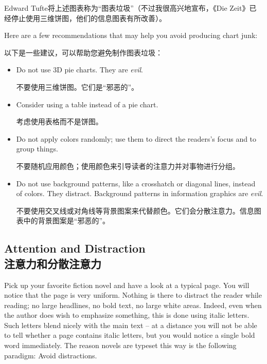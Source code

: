 Edward Tufte将上述图表称为“图表垃圾”（不过我很高兴地宣布，《Die Zeit》已经停止使用三维饼图，他们的信息图表有所改善）。


Here are a few recommendations that may help you avoid producing chart junk:

以下是一些建议，可以帮助您避免制作图表垃圾：

%
\begin{itemize}
    \item Do not use 3D pie charts. They are \emph{evil}.

    不要使用三维饼图。它们是“邪恶的”。


    \item Consider using a table instead of a pie chart.

    考虑使用表格而不是饼图。


    \item Do not apply colors randomly; use them to direct the readers's
        focus and to group things.

        不要随机应用颜色；使用颜色来引导读者的注意力并对事物进行分组。


    \item Do not use background patterns, like a crosshatch or diagonal
        lines, instead of colors. They distract. Background patterns in
        information graphics are \emph{evil}.

        不要使用交叉线或对角线等背景图案来代替颜色。它们会分散注意力。信息图表中的背景图案是“邪恶的”。


\end{itemize}


\subsection{Attention and Distraction\\注意力和分散注意力}

Pick up your favorite fiction novel and have a look at a typical page. You will
notice that the page is very uniform. Nothing is there to distract the reader
while reading; no large headlines, no bold text, no large white areas. Indeed,
even when the author does wish to emphasize something, this is done using
italic letters. Such letters blend nicely with the main text -- at a distance
you will not be able to tell whether a page contains italic letters, but you
would notice a single bold word immediately. The reason novels are typeset this
way is the following paradigm: Avoid distractions.

